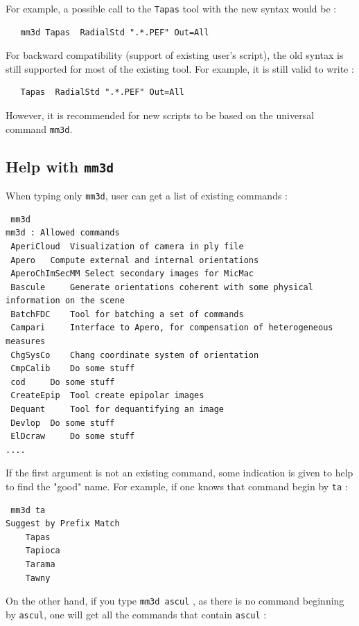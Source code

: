 For example, a possible call to the {\tt Tapas} tool with the new syntax would be :

\begin{verbatim}
   mm3d Tapas  RadialStd ".*.PEF" Out=All
\end{verbatim}


For backward compatibility (support of existing user's script), the old syntax is still supported
for most of the existing tool. For example, it is still valid to write :

\begin{verbatim}
   Tapas  RadialStd ".*.PEF" Out=All
\end{verbatim}

However, it is recommended for new scripts to be based on the universal command {\tt mm3d}.



\subsection{Help with {\tt mm3d}}

When typing only {\tt mm3d}, user can get a list of existing commands :


\begin{verbatim}
 mm3d
mm3d : Allowed commands
 AperiCloud	 Visualization of camera in ply file
 Apero	 Compute external and internal orientations
 AperoChImSecMM	Select secondary images for MicMac
 Bascule	 Generate orientations coherent with some physical information on the scene
 BatchFDC	 Tool for batching a set of commands
 Campari	 Interface to Apero, for compensation of heterogeneous measures
 ChgSysCo	 Chang coordinate system of orientation
 CmpCalib	 Do some stuff
 cod	 Do some stuff
 CreateEpip	 Tool create epipolar images
 Dequant	 Tool for dequantifying an image
 Devlop	 Do some stuff
 ElDcraw	 Do some stuff
....
\end{verbatim}

If the first argument is not an existing command, some indication is given to help to find
the "good" name. For example, if one knows that command begin by {\tt ta}  :

\begin{verbatim}
 mm3d ta
Suggest by Prefix Match
    Tapas
    Tapioca
    Tarama
    Tawny
\end{verbatim}

On the other hand, if you type {\tt mm3d ascul} , as there is no command beginning by {\tt ascul},
one will get all the commands that contain {\tt ascul} :


